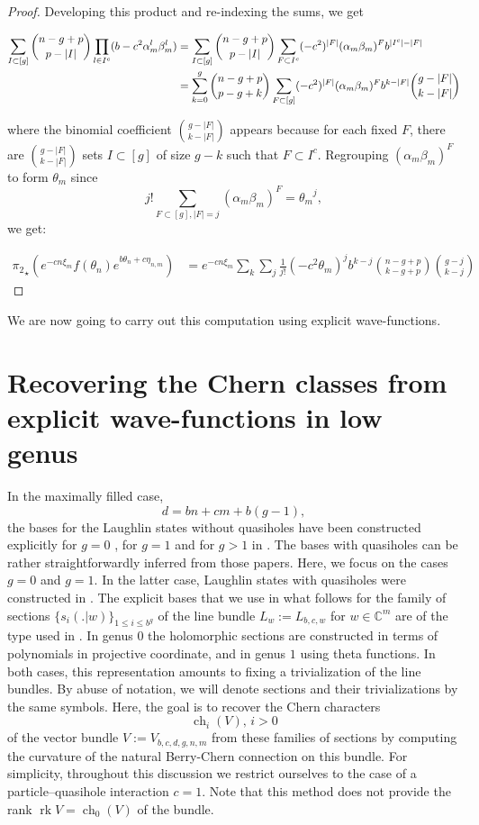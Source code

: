 \documentclass{article}
\theoremstyle{definition}
\DeclareMathOperator{\ch}{ch}
\DeclareMathOperator{\rk}{rk}
\newcommand{\eq}[2][1]{
\begin{equation*}
	\addtolength{\fboxsep}{0pt}
	\begin{alignedat}{#1}
	#2
	\end{alignedat}
\end{equation*}
}
\begin{document}
\begin{proof}
Developing this product and re-indexing the sums, we get 
\eq{
 \sum_{I\subset [g]} \binom{n-g+p}{p-|I|} \prod_{l\in I^c} (b-c^2 \alpha_m^l \beta_m^l) &=\sum_{I\subset [g]} \binom{n-g+p}{p-|I|} \sum_{F \subset I^c} (-c^2)^{|F|} (\alpha_m \beta_m)^F b^{|I^c|-|F|} \\
 &=\sum_{k=0}^g \binom{n-g+p}{p-g+k}\sum_{F\subset [g]} (-c^2)^{|F|} (\alpha_m \beta_m)^F b^{k-|F|} \binom{g-|F|}{k-|F|}\\
}
where the binomial coefficient $\binom{g-|F|}{k-|F|}$ appears because for each fixed $F$, there are $\binom{g-|F|}{k-|F|}$ sets $I \subset [g]$ of size $g-k$ such that $F\subset I^c$. 
Regrouping $(\alpha_m \beta_m)^F$ to form $\theta_m$ since $$j! \sum_{F \subset [g],|F|=j} (\alpha_m \beta_m)^F=  {\theta_m}^j,$$ we get: 

\begin{align}
    {\pi_2}_\star \left(e^{-cn \xi_m} f \left(\theta_n \right)  e^{ b \theta_n + c \eta_{n,m}} \right)&=e^{-cn \xi_m}\sum_k \sum_j \frac{1}{j!}(-c^2 \theta_m)^j b^{k-j} \binom{n-g+p}{k-g+p}\binom{g-j}{k-j}
\end{align}


\end{proof}


We are now going to carry out this computation using explicit wave-functions.


\section{Recovering the Chern classes from explicit wave-functions in low genus}
\label{sec:explicit}


In the maximally filled case,
\begin{equation}
d = bn + cm + b(g-1),
\end{equation}
the bases for the Laughlin states without quasiholes have been constructed explicitly for $g=0$ \cite{Haldane1983}, for $g=1$ \cite{Haldane1985} and for $g>1$ in \cite{Klevtsov2019}. The bases with quasiholes can be rather straightforwardly inferred from those papers. Here, we focus on the cases $g=0$ and $g=1$. In the latter case, Laughlin states with quasiholes were constructed in \cite{Einarsson1990}. The explicit bases that we use in what follows for the family of sections $\{s_{i}(.|w) \}_{1 \le i \le b^g}$ of the line bundle
$L_w := L_{b,c,w}$ for $w \in \mathbb{C}^m$ are of the type used in \cite{Klevtsov_2016,Burban_Klevtsov_2025,burban2024norms}. In genus $0$ the holomorphic sections are constructed in terms of polynomials in projective coordinate, and in genus $1$ using theta functions. In both cases, this representation amounts to fixing a trivialization of the line bundles. By abuse of notation, we will denote sections and their trivializations by the same symbols.
Here, the goal is to recover the Chern characters $$\ch_i(V),\, i>0$$ of the vector bundle $V := V_{b,c,d,g,n,m}$ from these families of sections by computing the curvature of the natural Berry-Chern connection on this bundle. For simplicity, throughout this discussion we restrict ourselves to the case of a particle--quasihole interaction $c=1$. Note that this method does not provide the rank $\rk V = \ch_0(V)$ of the bundle. 
\end{document}
